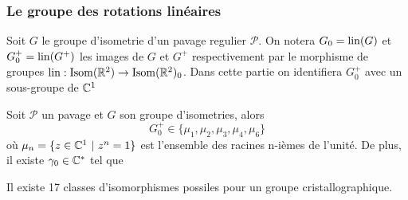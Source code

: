 \subsubsection{Le groupe des rotations linéaires}

\begin{notation}
	Soit $G$ le groupe d'isometrie d'un pavage regulier $\mathcal{P}$. On notera
	$G_0 = \operatorname{lin}(G)$ et $G_0^+ = \operatorname{lin}(G^+)$ les images de $G$ et $G^+$
	respectivement par le morphisme de groupes
	$\operatorname{lin}: \operatorname{Isom}(\mathbb{R}^2) \to \operatorname{Isom}(\mathbb{R}^2)_0$.
	Dans cette partie on identifiera $G_0^+$ avec un sous-groupe de $\mathbb{C}^1$
\end{notation}

\begin{theorem}
	Soit $\mathcal{P}$ un pavage et $G$ son groupe d'isometries,
	alors 
	\begin{equation*}
		G_0^+ \in \{\mu_1, \mu_2, \mu_3, \mu_4, \mu_6\}
	\end{equation*}
	où $\mu_n = \{z \in \mathbb{C}^1\ |\ z^n = 1\}$ est l'ensemble des racines n-ièmes de
	l'unité. De plus, il existe $\gamma_0 \in \mathbb{C}^*$ tel que
\end{theorem}

\begin{theorem}
	Il existe 17 classes d'isomorphismes possiles pour un groupe
	cristallographique.
\end{theorem}


